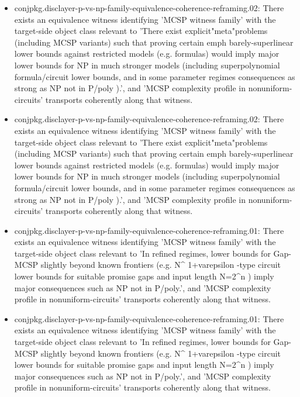 \documentclass[11pt]{article}
\begin{document}
\begin{itemize}
\item conjpkg.disclayer-p-vs-np-family-equivalence-coherence-reframing.02: There exists an equivalence witness identifying 'MCSP witness family' with the target-side object class relevant to 'There exist explicit"meta"problems (including MCSP variants) such that proving certain emph barely-superlinear lower bounds against restricted models (e.g. formulas) would imply major lower bounds for NP in much stronger models (including superpolynomial formula/circuit lower bounds, and in some parameter regimes consequences as strong as NP not in P/poly ).', and 'MCSP complexity profile in nonuniform-circuits' transports coherently along that witness.
\item conjpkg.disclayer-p-vs-np-family-equivalence-coherence-reframing.02: There exists an equivalence witness identifying 'MCSP witness family' with the target-side object class relevant to 'There exist explicit"meta"problems (including MCSP variants) such that proving certain emph barely-superlinear lower bounds against restricted models (e.g. formulas) would imply major lower bounds for NP in much stronger models (including superpolynomial formula/circuit lower bounds, and in some parameter regimes consequences as strong as NP not in P/poly ).', and 'MCSP complexity profile in nonuniform-circuits' transports coherently along that witness.
\item conjpkg.disclayer-p-vs-np-family-equivalence-coherence-reframing.01: There exists an equivalence witness identifying 'MCSP witness family' with the target-side object class relevant to 'In refined regimes, lower bounds for Gap-MCSP slightly beyond known frontiers (e.g. N\textasciicircum{} 1+varepsilon -type circuit lower bounds for suitable promise gaps and input length N=2\textasciicircum{}n ) imply major consequences such as NP not in P/poly.', and 'MCSP complexity profile in nonuniform-circuits' transports coherently along that witness.
\item conjpkg.disclayer-p-vs-np-family-equivalence-coherence-reframing.01: There exists an equivalence witness identifying 'MCSP witness family' with the target-side object class relevant to 'In refined regimes, lower bounds for Gap-MCSP slightly beyond known frontiers (e.g. N\textasciicircum{} 1+varepsilon -type circuit lower bounds for suitable promise gaps and input length N=2\textasciicircum{}n ) imply major consequences such as NP not in P/poly.', and 'MCSP complexity profile in nonuniform-circuits' transports coherently along that witness.
\end{itemize}
\end{document}
